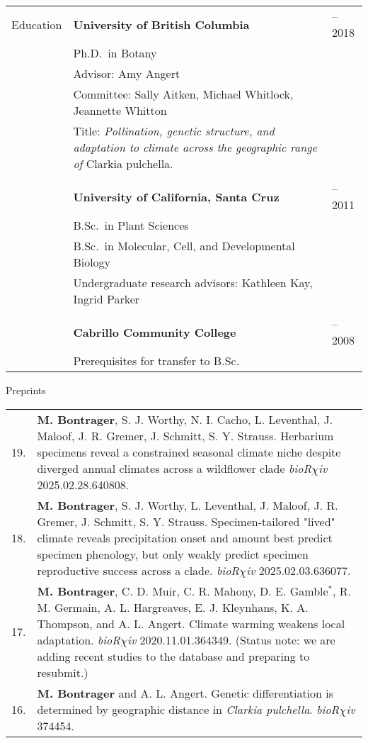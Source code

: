 \documentclass[letterpaper,11pt,oneside]{article}
\begin{document}
  

\noindent \begin{tabular}{@{} p{3cm} p{12cm} >{\raggedleft\arraybackslash}p{1.7cm}}
\Large{Education}    & \textbf{University of British Columbia} & 2012--2018 \\
& Ph.D.\ in Botany & \\
& \raggedright{Advisor: Amy Angert} & \\
& \raggedright{Committee: Sally Aitken, Michael Whitlock, Jeannette Whitton} &\\ 
& \raggedright{Title: \textit{Pollination, genetic structure, and adaptation to climate across the geographic range of} Clarkia pulchella.} &\\
& & \\
& \textbf{University of California, Santa Cruz} & 2008--2011 \\
& B.Sc.\ in Plant Sciences & \\
& B.Sc.\ in Molecular, Cell, and Developmental Biology & \\
& Undergraduate research advisors: Kathleen Kay, Ingrid Parker  & \\
& & \\
& \textbf{Cabrillo Community College} &  2007--2008 \\
& Prerequisites for transfer to B.Sc. & \\
\end{tabular}
\bigskip






\noindent\Large{Preprints} 
\normalsize
\medskip

\def\arraystretch{1.4}
\noindent \begin{tabular}{@{} p{0.5cm} >{\raggedright\arraybackslash}p{16.7cm}}
19. & \textbf{M. Bontrager}, S. J. Worthy, N. I. Cacho, L. Leventhal, J. Maloof, J. R. Gremer, J. Schmitt, S. Y. Strauss. Herbarium specimens reveal a constrained seasonal climate niche despite diverged annual climates across a wildflower clade \textit{bioR$\chi$iv} 2025.02.28.640808.\\
18. & \textbf{M. Bontrager}, S. J. Worthy, L. Leventhal, J. Maloof, J. R. Gremer, J. Schmitt, S. Y. Strauss. Specimen-tailored "lived" climate reveals precipitation onset and amount best predict specimen phenology, but only weakly predict specimen reproductive success across a clade. \textit{bioR$\chi$iv} 2025.02.03.636077.\\
17. & \textbf{M. Bontrager}, C. D. Muir, C. R. Mahony, D. E. Gamble$^{*}$, R. M. Germain, A. L. Hargreaves, E. J. Kleynhans, K. A. Thompson, and A. L. Angert. Climate warming weakens local adaptation. \textit{bioR$\chi$iv} 2020.11.01.364349. (Status note: we are adding recent studies to the database and preparing to resubmit.)\\
16. & \textbf{M. Bontrager} and A. L. Angert. Genetic differentiation is determined by geographic distance in \textit{Clarkia pulchella}. \textit{bioR$\chi$iv} 374454. \\ 
\end{tabular}
\end{document}
